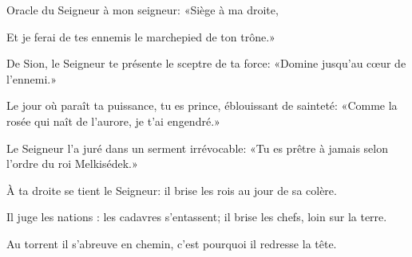 \item Oracle du Seigneur à mon seigneur: 
   «Siège à ma droite,

\item Et je ferai de tes ennemis 
   le marchepied de ton trône.»

\item De Sion, le Seigneur te présente
   le sceptre de ta force: 
«Domine jusqu'au cœur de l'ennemi.»

\item Le jour où paraît ta puissance,
   tu es prince, éblouissant de sainteté: 
«Comme la rosée qui naît de l'aurore,
   je t'ai engendré.»

\item Le Seigneur l'a juré
   dans un serment irrévocable: 
«Tu es prêtre à jamais
   selon l'ordre du roi Melkisédek.»

\item À ta droite se tient le Seigneur: 
il brise les rois au jour de sa colère.

\item Il juge les nations : les cadavres s'entassent; il brise les chefs, loin sur la terre.

\item Au torrent il s'abreuve en chemin, 
c'est pourquoi il redresse la tête.